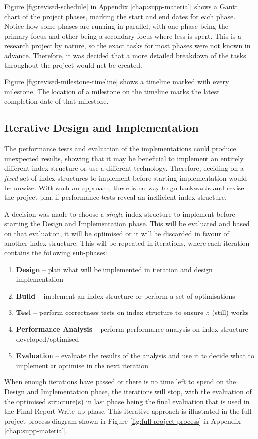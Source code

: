 Figure \ref{fig:revised-schedule} in Appendix \ref{chap:supp-material} shows a Gantt chart of the project phases, marking the start and end dates for each phase. Notice how some phases are running in parallel, with one phase being the primary focus and other being a secondary focus where less is spent. This is a research project by nature, so the exact tasks for most phases were not known in advance. Therefore, it was decided that a more detailed breakdown of the tasks throughout the project would not be created.

Figure \ref{fig:revised-milestone-timeline} shows a timeline marked with every milestone. The location of a milestone on the timeline marks the latest completion date of that milestone.

\subsection{Iterative Design and Implementation}
\label{sec:iterative-d-and-i}

The performance tests and evaluation of the implementations could produce unexpected results, showing that it may be beneficial to implement an entirely different index structure or use a different technology. Therefore, deciding on a \textit{fixed} set of index structures to implement before starting implementation would be unwise. With such an approach, there is no way to go backwards and revise the project plan if performance tests reveal an inefficient index structure.

A decision was made to choose a \textit{single} index structure to implement before starting the Design and Implementation phase. This will be evaluated and based on that evaluation, it will be optimised or it will be discarded in favour of another index structure. This will be repeated in iterations, where each iteration contains the following sub-phases:
\begin{enumerate}
	\item \textbf{Design} -- plan what will be implemented in iteration and design implementation
	\item \textbf{Build} -- implement an index structure or perform a set of optimisations
	\item \textbf{Test} -- perform correctness tests on index structure to ensure it (still) works
	\item \textbf{Performance Analysis} -- perform performance analysis on index structure developed/optimised
	\item \textbf{Evaluation} -- evaluate the results of the analysis and use it to decide what to implement or optimise in the next iteration
\end{enumerate}
When enough iterations have passed or there is no time left to spend on the Design and Implementation phase, the iterations will stop, with the evaluation of the optimised structure(s) in last phase being the final evaluation that is used in the Final Report Write-up phase. This iterative approach is illustrated in the full project process diagram shown in Figure \ref{fig:full-project-process} in Appendix \ref{chap:supp-material}.

